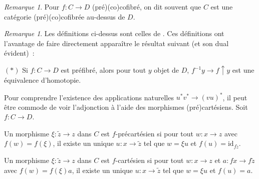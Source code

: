 \documentclass{amsart}
\theoremstyle{plain}
\theoremstyle{definition}
\theoremstyle{remark}
\newtheorem{rem}[theo]{Remarque}
\newcommand{\id}{\mathrm{id}}
\newcommand{\ra}{\rightarrow}
\begin{document}
\begin{rem}
  Pour $f:C\ra D$ (pré)(co)cofibré, on dit souvent que $C$ est une catégorie (pré)(co)cofibrée au-dessus de $D$.
\end{rem}

\begin{rem}
  Les définitions ci-dessus sont celles de \cite[§1]{Quil}. Ces définitions ont l'avantage de faire directement apparaître le résultat suivant
  (et son dual évident)~:

  $(*)$ Si $f:C\ra D$ est préfibré, alors pour tout $y$ objet de $D$, $f^{-1}y\ra f\uparrow y$ est une équivalence d'homotopie.

  Pour comprendre l'existence des applications naturelles
  $u^*v^*\ra (vu)^*$, il peut être commode de voir l'adjonction à l'aide des morphismes (pré)cartésiens. Soit $f:C\ra D$.
  
  Un morphisme $\xi:\tilde{z}\ra z$ dans $C$ est $f$-précartésien si pour tout $w:x\ra z$ avec $f(w)=f(\xi)$, il existe
  un unique $u:x\ra \tilde{z}$ tel que $w=\xi u$ et $f(u)=\id_{f\tilde{z}}$.

  \begin{center}
  \end{center}
  
  Un morphisme $\xi:\tilde{z}\ra z$ dans $C$ est $f$-cartésien si pour tout $w:x\ra z$ et $a:fx\ra f\tilde{z}$ avec $f(w)=f(\xi)a$, il existe
  un unique $u:x\ra \tilde{z}$ tel que $w=\xi u$ et $f(u)=a$.

  \begin{center}
  \end{center}


\end{rem}
\end{document}

